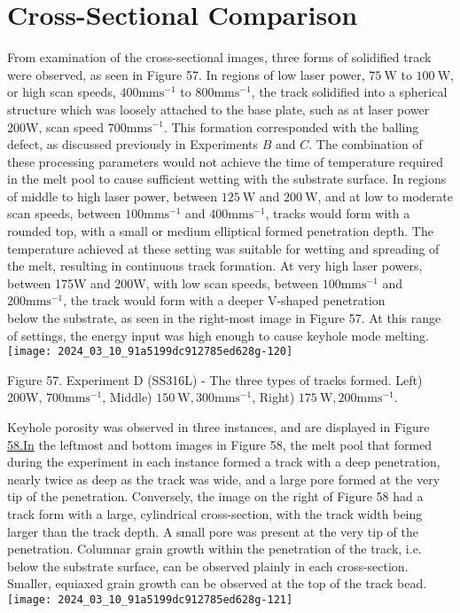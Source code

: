 \documentclass[10pt]{article}
\begin{document}
\section*{Cross-Sectional Comparison}
From examination of the cross-sectional images, three forms of solidified track were observed, as seen in Figure 57. In regions of low laser power, $75 \mathrm{~W}$ to $100 \mathrm{~W}$, or high scan speeds, $400 \mathrm{mms}^{-1}$ to $800 \mathrm{mms}^{-1}$, the track solidified into a spherical structure which was loosely attached to the base plate, such as at laser power 200W, scan speed $700 \mathrm{mms}^{-1}$. This formation corresponded with the balling defect, as discussed previously in Experiments $B$ and $C$. The combination of these processing parameters would not achieve the time of temperature required in the melt pool to cause sufficient wetting with the substrate surface. In regions of middle to high laser power, between $125 \mathrm{~W}$ and $200 \mathrm{~W}$, and at low to moderate scan speeds, between $100 \mathrm{mms}^{-1}$ and $400 \mathrm{mms}^{-1}$, tracks would form with a rounded top, with a small or medium elliptical formed penetration depth. The temperature achieved at these setting was suitable for wetting and spreading of the melt, resulting in continuous track formation. At very high laser powers, between 175W and 200W, with low scan speeds, between $100 \mathrm{mms}^{-1}$ and $200 \mathrm{mms}^{-1}$, the track would form with a deeper V-shaped penetration\\
below the substrate, as seen in the right-most image in Figure 57. At this range of settings, the energy input was high enough to cause keyhole mode melting.\\
\texttt{[image: 2024\_03\_10\_91a5199dc912785ed628g-120]}

Figure 57. Experiment D (SS316L) - The three types of tracks formed. Left) 200W, $700 \mathrm{mms}^{-1}$, Middle) $150 \mathrm{~W}, 300 \mathrm{mms}^{-1}$, Right) $175 \mathrm{~W}, 200 \mathrm{mms}^{-1}$.

Keyhole porosity was observed in three instances, and are displayed in Figure \href{http://58.In}{58.In} the leftmost and bottom images in Figure 58, the melt pool that formed during the experiment in each instance formed a track with a deep penetration, nearly twice as deep as the track was wide, and a large pore formed at the very tip of the penetration. Conversely, the image on the right of Figure 58 had a track form with a large, cylindrical cross-section, with the track width being larger than the track depth. A small pore was present at the very tip of the penetration. Columnar grain growth within the penetration of the track, i.e. below the substrate surface, can be observed plainly in each cross-section. Smaller, equiaxed grain growth can be observed at the top of the track bead.\\
\texttt{[image: 2024\_03\_10\_91a5199dc912785ed628g-121]}
\end{document}
